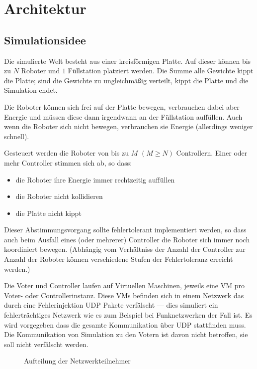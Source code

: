 \clearpage
\section{Architektur}

\subsection{Simulationsidee}
Die simulierte Welt besteht aus einer kreisf{\"{o}}rmigen Platte. Auf dieser k{\"{o}}nnen bis zu $N$ Roboter und $1$ F{\"{u}}llstation
platziert werden. Die Summe alle Gewichte kippt die Platte; sind die Gewichte zu ungleichm{\"{a}}{\ss}ig verteilt, kippt
die Platte und die Simulation endet.

Die Roboter k{\"{o}}nnen sich frei auf der Platte bewegen, verbrauchen dabei aber Energie und m{\"{u}}ssen diese dann irgendwann
an der F{\"{u}}llstation auff{\"{u}}llen. Auch wenn die Roboter sich nicht bewegen, verbrauchen sie Energie (allerdings weniger
schnell).

Gesteuert werden die Roboter von bis zu $M$ $(M \geq N)$ Controllern. Einer oder mehr Controller stimmen sich ab,
so dass:
\begin{itemize}
\item die Roboter ihre Energie immer rechtzeitig auff{\"{u}}llen
\item die Roboter nicht kollidieren
\item die Platte nicht kippt
\end{itemize}

Dieser Abstimmungsvorgang sollte fehlertolerant implementiert werden, so dass auch beim Ausfall eines (oder mehrerer) Controller die Roboter sich immer noch koordiniert bewegen.
(Abh{\"{a}}ngig vom Verh{\"{a}}ltniss der Anzahl der Controller zur Anzahl der Roboter k{\"{o}}nnen verschiedene Stufen der Fehlertoleranz erreicht werden.\cite[s.149]{Werner00})

Die Voter und Controller laufen auf Virtuellen Maschinen, jeweils eine VM pro Voter- oder Controllerinstanz.
Diese VMs befinden sich in einem Netzwerk das durch eine Fehlerinjektion UDP Pakete verf{\"{a}}lscht --- dies simuliert ein fehlertr{\"{a}}chtiges Netzwerk wie es zum Beispiel bei Funknetzwerken der Fall ist.
Es wird vorgegeben dass die gesamte Kommunikation {\"{u}}ber UDP stattfinden muss. Die Kommunikation von Simulation zu den Votern ist davon nicht betroffen, sie soll nicht verf{\"{a}}lscht werden.

\begin{figure}
	\centering
	\caption{Aufteilung der Netzwerkteilnehmer}
	\label{fig:network}
\end{figure}

